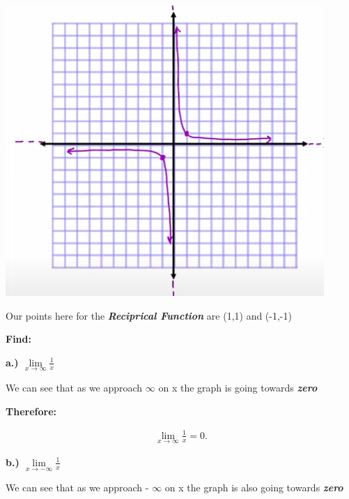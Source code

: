 \documentclass{report}
\begin{document}
        \bigbreak \noindent \bigbreak \noindent 
        \begin{center}
            \includegraphics[scale=0.5]{../images/13.png}
        \end{center}

        \bigbreak \noindent 
        \begin{center}
            Our points here for the \textbf{\textit{Reciprical Function}} are (1,1) and (-1,-1)
        \end{center} 

        \bigbreak \noindent \bigbreak \noindent 
        \textbf{Find:}

        \bigbreak \noindent 
        \textbf{a.) $\lim\limits_{x \to \infty}{\frac{1}{x}}$}

        \bigbreak \noindent 
        We can see that as we approach $\infty$ on x the graph is going towards \textbf{\textit{zero}}

        \bigbreak \noindent 
        \textbf{Therefore:}

        \begin{align*}
            \lim\limits_{x \to \infty}{ \frac{1}{x}} = 0
        .\end{align*}

        \bigbreak \noindent \bigbreak \noindent 
        \textbf{b.) $\lim\limits_{x \to - \infty}{ \frac{1}{x}}$}

        \bigbreak \noindent 
        We can see that as we approach - $\infty$ on x the graph is also going towards \textbf{\textit{zero}}
\end{document}
